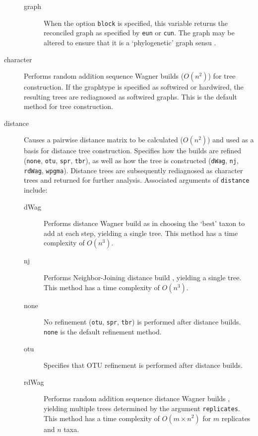 \begin{description}
\begin{description}
			\item[graph] When the option \texttt{block} is specified, this variable returns the 
			reconciled graph as specified by \texttt{eun} or \texttt{cun}. The graph may be 
			altered to ensure that it is a `phylogenetic' graph sensu \cite{Moretetal2005}.
			
		\end{description}			
		
		\item [character] Performs random addition sequence Wagner \citep{Farris1970} builds 
		($O(n^2)$) for tree construction. If the graphtype is specified as softwired or hardwired, 
		the resulting trees are rediagnosed as softwired graphs. This is 
		the default method for tree construction.
		
		\item [distance] Causes a pairwise distance matrix to be calculated ($O(n^2)$) and used 
		as a basis for distance tree construction. Specifies how the builds are refined (\texttt{none}, 
		\texttt{otu}, \texttt{spr}, \texttt{tbr}), as well as how the tree is constructed (\texttt{dWag}, 
		\texttt{nj}, \texttt{rdWag}, \texttt{wpgma}). Distance trees are subsequently rediagnosed 
		as character trees and returned for further analysis. Associated arguments of \texttt{distance} 
		include:
					
		\begin{description}
		
			\item[dWag] Performs distance Wagner build as in \citep{Farris1972} choosing the 
			`best' taxon to 
			add at each step, yielding a single tree. This method has a time complexity of $O(n^3)$.

			\item[nj] Performs Neighbor-Joining distance build \citep{Saitou1987}, yielding a single 
			tree. This method has a time complexity of $O(n^3)$.

			\item[none] No refinement (\texttt{otu}, \texttt{spr}, \texttt{tbr}) is performed after 
			distance builds. \texttt{none} is the default refinement method.
						
			\item[otu] Specifies that OTU refinement \citep{Wheeler2021} is performed 
			after distance builds.
			
			\item[rdWag] Performs random addition sequence distance Wagner builds 
			\citep{Farris1972,Wheeler2021}, yielding multiple trees determined by the 
			argument \texttt{replicates}. This method has a time complexity of $O(m \times n^2)$
			for $m$ replicates and $n$ taxa.
			

\end{description}
\end{description}
